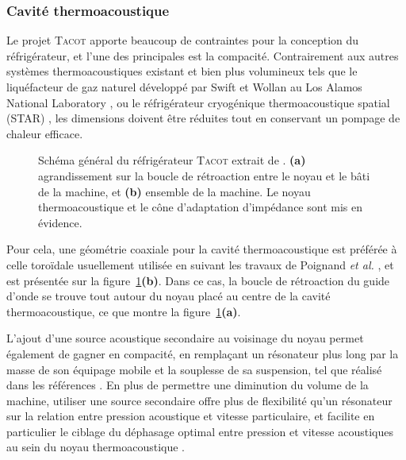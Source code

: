 \subsubsection{Cavité thermoacoustique}
Le projet \textsc{Tacot} apporte beaucoup de contraintes pour la conception du réfrigérateur, et l'une des principales est la compacité. Contrairement aux autres systèmes thermoacoustiques existant et bien plus volumineux tels que le liquéfacteur de gaz naturel développé par Swift et Wollan au Los Alamos National Laboratory \cite{swift_thermoacoustics_2002, wollan_development_2002}, ou le réfrigérateur cryogénique thermoacoustique spatial (STAR) \cite{adeff_measurement_1991, garrett_thermoacoustic_1993}, les dimensions doivent être réduites tout en conservant un pompage de chaleur efficace. 

\begin{figure}[!ht]
    \centering
    
    \caption{Schéma général du réfrigérateur \textsc{Tacot} extrait de \cite{ramadan_design_2021}. \textbf{(a)} agrandissement sur la boucle de rétroaction entre le noyau et le bâti de la machine, et \textbf{(b)} ensemble de la machine. Le noyau thermoacoustique et le cône d'adaptation d'impédance sont mis en évidence.}
    \label{fig:SchemaGeneralTACOT}
\end{figure}

Pour cela, une géométrie coaxiale pour la cavité thermoacoustique est préférée à celle toroïdale usuellement utilisée en suivant les travaux de Poignand \textit{et al.} \cite{poignand_thermoacoustic_2011, poignand_analysis_2013}, et est présentée sur la figure~\ref{fig:SchemaGeneralTACOT}\textbf{(b)}. Dans ce cas, la boucle de rétroaction du guide d'onde se trouve tout autour du noyau placé au centre de la cavité thermoacoustique, ce que montre la figure~\ref{fig:SchemaGeneralTACOT}\textbf{(a)}.

L'ajout d'une source acoustique secondaire au voisinage du noyau permet également de gagner en compacité, en remplaçant un résonateur plus long par la masse de son équipage mobile et la souplesse de sa suspension, tel que réalisé dans les références \cite{poese_thermoacoustic_2004, poignand_thermoacoustic_2011, poignand_analysis_2013}. En plus de permettre une diminution du volume de la machine, utiliser une source secondaire offre plus de flexibilité qu'un résonateur sur la relation entre pression acoustique et vitesse particulaire, et facilite en particulier le ciblage du déphasage optimal entre pression et vitesse acoustiques au sein du noyau thermoacoustique \cite{poignand_thermoacoustic_2011, poignand_analysis_2013}.\smallskip

